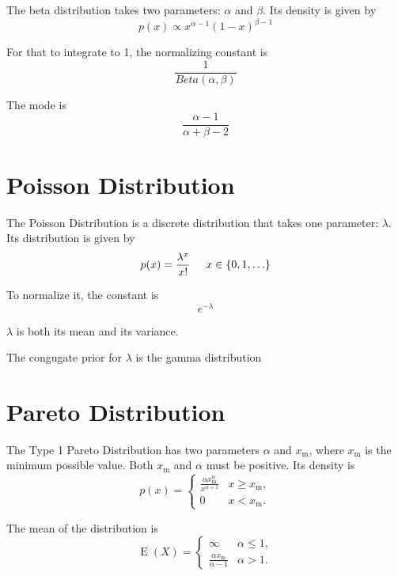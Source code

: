 \documentclass[12pt]{article}
\begin{document}
The beta distribution takes two parameters: $\alpha$ and $\beta$. Its density is given by
\begin{equation*}
p(x) \propto  x^{\alpha-1}(1-x)^{\beta-1}
\end{equation*}

For that to integrate to 1, the normalizing constant is
\begin{equation*}
\frac{1}{Beta(\alpha,\beta)}
\end{equation*}

The mode is
\begin{equation*}
\frac{\alpha - 1} {\alpha + \beta - 2}
\end{equation*}

\section*{Poisson Distribution}

The Poisson Distribution is a discrete distribution that takes one parameter: $\lambda$. Its distribution is given by
\begin{equation*}
p(x) = \frac{\lambda^x}{x!} \hspace{5mm}  x \in \lbrace 0, 1, \ldots\rbrace
\end{equation*}

To normalize it, the constant is
\begin{equation*}
e^{-\lambda}
\end{equation*}

$\lambda$ is both its mean and its variance.

The congugate prior for $\lambda$ is the gamma distribution

\section*{Pareto Distribution}

The Type 1 Pareto Distribution has two parameters $\alpha$ and $x_\mathrm{m}$, where $x_\mathrm{m}$ is the minimum possible value.  Both  $x_\mathrm{m}$ and $\alpha$ must be positive. Its density is
\begin{equation*}
p(x)= \begin{cases} \frac{\alpha x_\mathrm{m}^\alpha}{x^{\alpha+1}} & x \ge x_\mathrm{m}, \\ 0 & x < x_\mathrm{m}. \end{cases}
\end{equation*}

The mean of the distribution is
\begin{equation*}
\operatorname{E}(X)= \begin{cases} \infty & \alpha\le 1, \\
\frac{\alpha x_\mathrm{m}}{\alpha-1} & \alpha>1.
\end{cases}
\end{equation*}
\end{document}
